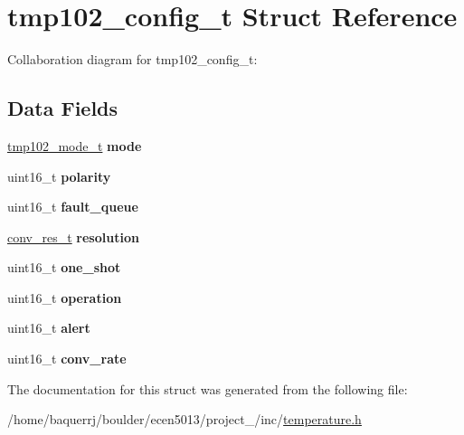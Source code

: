 \hypertarget{structtmp102__config__t}{}\section{tmp102\+\_\+config\+\_\+t Struct Reference}
\label{structtmp102__config__t}


Collaboration diagram for tmp102\+\_\+config\+\_\+t\+:
\subsection*{Data Fields}
\begin{DoxyCompactItemize}
\item 
\mbox{\label{structtmp102__config__t_acf4ff9a21f7a33783c7c85dbf2038644}} 
\hyperlink{structtmp102__mode__t}{tmp102\+\_\+mode\+\_\+t} {\bfseries mode}
\item 
\mbox{\label{structtmp102__config__t_ad38785f11097e4e2ef4fee8eea9491fd}} 
uint16\+\_\+t {\bfseries polarity}
\item 
\mbox{\label{structtmp102__config__t_ac68803e7032a27073c68d76ad1ab2ec4}} 
uint16\+\_\+t {\bfseries fault\+\_\+queue}
\item 
\mbox{\label{structtmp102__config__t_a7f1af33727dec48bc9ae9f6330967aaa}} 
\hyperlink{structconv__res__t}{conv\+\_\+res\+\_\+t} {\bfseries resolution}
\item 
\mbox{\label{structtmp102__config__t_a2ea838458818581e4235bd67b535859d}} 
uint16\+\_\+t {\bfseries one\+\_\+shot}
\item 
\mbox{\label{structtmp102__config__t_a790f7ee5708079589771bfe3e48c5076}} 
uint16\+\_\+t {\bfseries operation}
\item 
\mbox{\label{structtmp102__config__t_aab6501536ba8a625ae96be63a7865a5a}} 
uint16\+\_\+t {\bfseries alert}
\item 
\mbox{\label{structtmp102__config__t_a7fb6619a920d6ac7e8ea8b6863617d65}} 
uint16\+\_\+t {\bfseries conv\+\_\+rate}
\end{DoxyCompactItemize}


The documentation for this struct was generated from the following file\+:\begin{DoxyCompactItemize}
\item 
/home/baquerrj/boulder/ecen5013/project\+\_/inc/\hyperlink{temperature_8h}{temperature.\+h}\end{DoxyCompactItemize}
